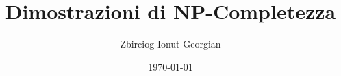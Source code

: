 \documentclass{article}
\title{Dimostrazioni di \textbf{NP}-Completezza}
\author{Zbirciog Ionut Georgian}
\date{\today}
\begin{document}
\maketitle

\begin{flushleft}

\tableofcontents



\end{flushleft}
\end{document}
